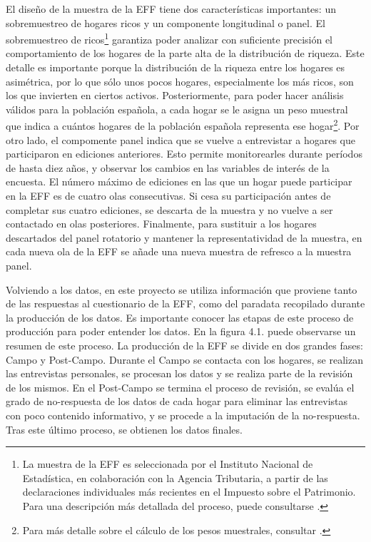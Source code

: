 El diseño de la muestra de la EFF tiene dos características importantes: un sobremuestreo de hogares ricos y un componente longitudinal o panel. El sobremuestreo de ricos\footnote{La muestra de la EFF es seleccionada por el Instituto Nacional de Estadística, en colaboración con la Agencia Tributaria, a partir de las declaraciones individuales más recientes en el Impuesto sobre el Patrimonio. Para una descripción más detallada del proceso, puede consultarse \cite{effmethod2017}.} garantiza poder analizar con suficiente precisión el comportamiento de los hogares de la parte alta de la distribución de riqueza. Este detalle es importante porque la distribución de la riqueza entre los hogares es asimétrica, por lo que sólo unos pocos hogares, especialmente los más ricos, son los que invierten en ciertos activos. Posteriormente, para poder hacer análisis válidos para la población española, a cada hogar se le asigna un peso muestral que indica a cuántos hogares de la población española representa ese hogar\footnote{Para más detalle sobre el cálculo de los pesos muestrales, consultar \cite{effmethod2002}.}. Por otro lado, el compomente panel indica que se vuelve a entrevistar a hogares que participaron en ediciones anteriores. Esto permite monitorearles durante períodos de hasta diez años, y observar los cambios en las variables de interés de la encuesta. El número máximo de ediciones en las que un hogar puede participar en la EFF es de cuatro olas consecutivas. Si cesa su participación antes de completar sus cuatro ediciones, se descarta de la muestra y no vuelve a ser contactado en olas posteriores. Finalmente, para sustituir a los hogares descartados del panel rotatorio y mantener la representatividad de la muestra, en cada nueva ola de la EFF se añade una nueva muestra de refresco a la muestra panel.

Volviendo a los datos, en este proyecto se utiliza información que proviene tanto de las respuestas al cuestionario de la EFF, como del paradata recopilado durante la producción de los datos. Es importante conocer las etapas de este proceso de producción para poder entender los datos. En la figura 4.1. puede observarse un resumen de este proceso. La producción de la EFF se divide en dos grandes fases: Campo y Post-Campo. Durante el Campo se contacta con los hogares, se realizan las entrevistas personales, se procesan los datos y se realiza parte de la revisión de los mismos. En el Post-Campo se termina el proceso de revisión, se evalúa el grado de no-respuesta de los datos de cada hogar para eliminar las entrevistas con poco contenido informativo, y se procede a la imputación de la no-respuesta. Tras este último proceso, se obtienen los datos finales.

